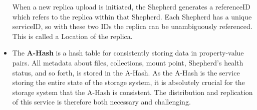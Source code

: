 \documentclass{llncs}
\begin{document}
\begin{itemize}
When a new replica upload
is initiated, the Shepherd generates a referenceID which refers to
the replica within
that Shepherd. Each Shepherd has a unique serviceID, so with these two
IDs the replica can be unambiguously referenced. This is called a Location
of the replica. %




\item The \textbf{A-Hash}  %
is a hash table for consistently storing data in property-value
pairs. All metadata about files, collections, mount point, Shepherd's
health status, and so forth, is stored in the A-Hash. As the A-Hash is
the service storing the entire state of the storage system, it is
absolutely crucial for the storage system that the A-Hash is
consistent. The distribution and replication of this service is
therefore both necessary and challenging.

\end{itemize}
\end{document}
